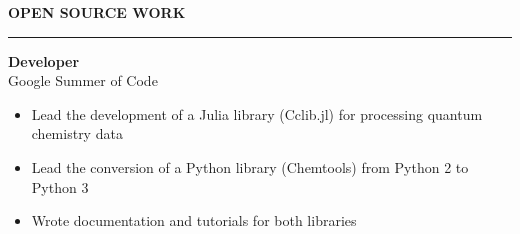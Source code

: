 \documentclass[11pt]{article}
\begin{document}
\vspace*{0.1in}

{\color{headinggray}\textbf{\large OPEN SOURCE WORK}}\\[-10pt]
\noindent\textcolor{accentblue}{\rule{\textwidth}{1.5pt}}
\vspace*{-0.15in}

\textbf{Developer}\\
{\color{accentgray} Google Summer of Code}\\[4pt]
\begin{itemize}[itemsep=0.1pt, topsep=0pt]
    \item Lead the development of a Julia library (Cclib.jl) for processing quantum chemistry data
    \item Lead the conversion of a Python library (Chemtools) from Python 2 to Python 3
    \item Wrote documentation and tutorials for both libraries
\end{itemize}
\end{document}

